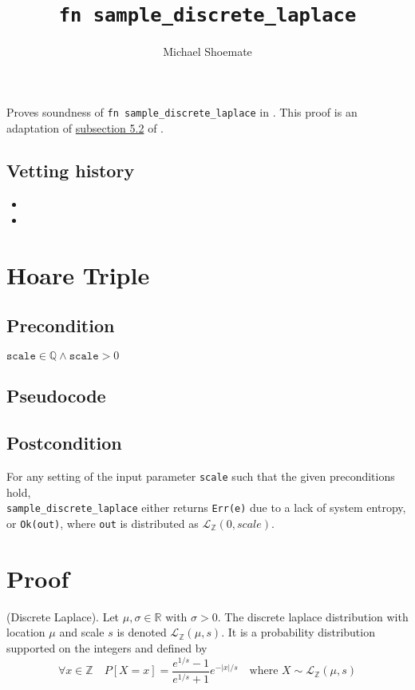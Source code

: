\documentclass{article}
\title{\texttt{fn sample\_discrete\_laplace}}
\author{Michael Shoemate}
\begin{document}
\maketitle

\contrib
Proves soundness of \texttt{fn sample\_discrete\_laplace} in .
This proof is an adaptation of \href{https://arxiv.org/pdf/2004.00010.pdf#subsection.5.2}{subsection 5.2} of \cite{CKS20}.

\subsection*{Vetting history}
\begin{itemize}
    \item {}
    \item {}
\end{itemize}

\section{Hoare Triple}
\subsection*{Precondition}
$\texttt{scale} \in \mathbb{Q} \land \texttt{scale} > 0$

\subsection*{Pseudocode}


\subsection*{Postcondition}
\label{postcondition}
For any setting of the input parameter \texttt{scale} such that the given preconditions hold, \\
\texttt{sample\_discrete\_laplace} either returns \texttt{Err(e)} due to a lack of system entropy,
or \texttt{Ok(out)}, where \texttt{out} is distributed as $\mathcal{L}_\mathbb{Z}(0, scale)$.

\section{Proof}
\begin{definition} \cite{BV17}
    (Discrete Laplace). Let $\mu, \sigma \in \mathbb{R}$ with $\sigma > 0$.
    The discrete laplace distribution with location $\mu$ and scale $s$ is denoted $\mathcal{L}_\mathbb{Z}(\mu, s)$.
    It is a probability distribution supported on the integers and defined by
    \begin{equation*}
        \forall x \in \mathbb{Z} \quad  P[X = x] = \frac{e^{1/s} - 1}{e^{1/s} + 1} e^{-|x|/s} \quad \text{where } X \sim \mathcal{L}_\mathbb{Z}(\mu, s)
    \end{equation*}
\end{definition}
\end{document}
